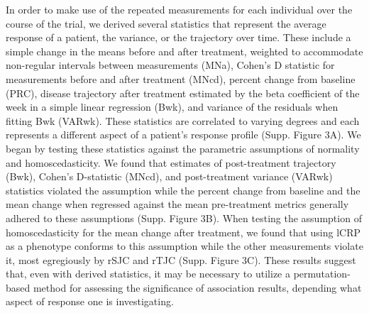 In order to make use of the repeated measurements for each individual over the course of the trial, we derived several statistics that represent the average response of a patient, the variance, or the trajectory over time. These include a simple change in the means before and after treatment, weighted to accommodate non-regular intervals between measurements (MNa), Cohen’s D statistic for measurements before and after treatment (MNcd), percent change from baseline (PRC), disease trajectory after treatment estimated by the beta coefficient of the week in a simple linear regression (Bwk), and variance of the residuals when fitting Bwk (VARwk). These statistics are correlated to varying degrees and each represents a different aspect of a patient’s response profile (Supp. Figure 3A). We began by testing these statistics against the parametric assumptions of normality and homoscedasticity. We found that estimates of post-treatment trajectory (Bwk), Cohen’s D-statistic (MNcd), and post-treatment variance (VARwk) statistics violated the assumption while the percent change from baseline and the mean change when regressed against the mean pre-treatment metrics generally adhered to these assumptions (Supp. Figure 3B). When testing the assumption of homoscedasticity for the mean change after treatment, we found that using lCRP as a phenotype conforms to this assumption while the other measurements violate it, most egregiously by rSJC and rTJC (Supp. Figure 3C). These results suggest that, even with derived statistics, it may be necessary to utilize a permutation-based method for assessing the significance of association results, depending what aspect of response one is investigating.


